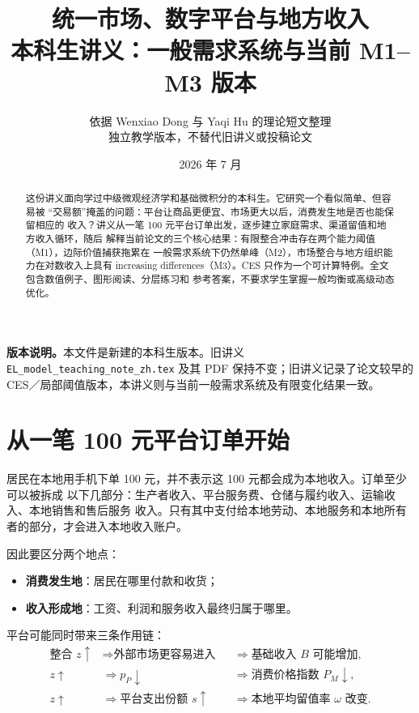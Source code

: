 \documentclass[UTF8,11pt,scheme=chinese,fontset=fandol]{ctexart}
\title{\textbf{统一市场、数字平台与地方收入}\\[0.45em]
\large 本科生讲义：一般需求系统与当前 M1--M3 版本}
\author{依据 Wenxiao Dong 与 Yaqi Hu 的理论短文整理\\
\small 独立教学版本，不替代旧讲义或投稿论文}
\date{2026 年 7 月}
\theoremstyle{definition}
\begin{document}
\maketitle

\begin{abstract}
这份讲义面向学过中级微观经济学和基础微积分的本科生。它研究一个看似简单、但容易被
“交易额”掩盖的问题：平台让商品更便宜、市场更大以后，消费发生地是否也能保留相应的
收入？讲义从一笔 100 元平台订单出发，逐步建立家庭需求、渠道留值和地方收入循环，随后
解释当前论文的三个核心结果：有限整合冲击存在两个能力阈值（M1），边际价值捕获拖累在
一般需求系统下仍然单峰（M2），市场整合与地方组织能力在对数收入上具有 increasing
differences（M3）。CES 只作为一个可计算特例。全文包含数值例子、图形阅读、分层练习和
参考答案，不要求学生掌握一般均衡或高级动态优化。
\end{abstract}

\noindent\textbf{版本说明。}本文件是新建的本科生版本。旧讲义
\texttt{EL\_model\_teaching\_note\_zh.tex} 及其 PDF 保持不变；旧讲义记录了论文较早的
CES／局部阈值版本，本讲义则与当前一般需求系统及有限变化结果一致。

\tableofcontents
\clearpage

\section{从一笔 100 元平台订单开始}

居民在本地用手机下单 100 元，并不表示这 100 元都会成为本地收入。订单至少可以被拆成
以下几部分：生产者收入、平台服务费、仓储与履约收入、运输收入、本地销售和售后服务
收入。只有其中支付给本地劳动、本地服务和本地所有者的部分，才会进入本地收入账户。

因此要区分两个地点：
\begin{itemize}
  \item \textbf{消费发生地}：居民在哪里付款和收货；
  \item \textbf{收入形成地}：工资、利润和服务收入最终归属于哪里。
\end{itemize}

平台可能同时带来三条作用链：
\[
\boxed{
\begin{aligned}
\text{整合 }z\uparrow
&\Longrightarrow \text{外部市场更容易进入}
&&\Longrightarrow \text{基础收入 }B\text{ 可能增加},\\
z\uparrow
&\Longrightarrow p_P\downarrow
&&\Longrightarrow \text{消费价格指数 }P_M\downarrow,\\
z\uparrow
&\Longrightarrow \text{平台支出份额 }s\uparrow
&&\Longrightarrow \text{本地平均留值率 }\omega\text{ 改变}.
\end{aligned}}
\]
\end{document}
